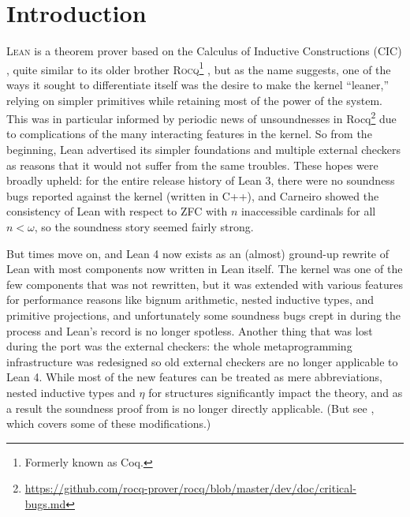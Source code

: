 \documentclass[sigplan,10pt,screen]{acmart}\settopmatter{printfolios=true,printccs=false,printacmref=false}
\begin{document}


\maketitle

\section{Introduction}

\textsc{Lean} \cite{demoura} is a theorem prover based on the Calculus of Inductive Constructions (\textsf{CIC}) \cite{cic}, quite similar to its older brother \textsc{Rocq}\footnote{Formerly known as Coq.} \cite{coq2020}, but as the name suggests, one of the ways it sought to differentiate itself was the desire to make the kernel ``leaner,'' relying on simpler primitives while retaining most of the power of the system. This was in particular informed by periodic news of unsoundnesses in Rocq\footnote{\url{https://github.com/rocq-prover/rocq/blob/master/dev/doc/critical-bugs.md}} due to complications of the many interacting features in the kernel. So from the beginning, Lean advertised its simpler foundations and multiple external checkers \cite{tc,trepplein} as reasons that it would not suffer from the same troubles. These hopes were broadly upheld: for the entire release history of Lean 3, there were no soundness bugs reported against the kernel (written in C++), and Carneiro \cite{leantt} showed the consistency of Lean with respect to ZFC with $n$ inaccessible cardinals for all $n<\omega$, so the soundness story seemed fairly strong.

But times move on, and Lean 4 now exists as an (almost) ground-up rewrite of Lean with most components now written in Lean itself. The kernel was one of the few components that was not rewritten, but it was extended with various features for performance reasons like bignum arithmetic, nested inductive types, and primitive projections, and unfortunately some soundness bugs crept in during the process and Lean's record is no longer spotless. Another thing that was lost during the port was the external checkers: the whole metaprogramming infrastructure was redesigned so old external checkers are no longer applicable to Lean 4. While most of the new features can be treated as mere abbreviations, nested inductive types and $\eta$ for structures significantly impact the theory, and as a result the soundness proof from \cite{leantt} is no longer directly applicable. (But see \cite{sebastianthesis}, which covers some of these modifications.)
\end{document}
